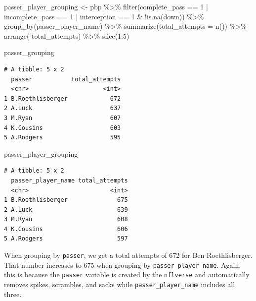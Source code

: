 \documentclass[
  letterpaper,
]{krantz}
\newenvironment{Shaded}{\begin{snugshade}}{\end{snugshade}}
\newcommand{\AttributeTok}[1]{\textcolor[rgb]{0.40,0.45,0.13}{#1}}
\newcommand{\DecValTok}[1]{\textcolor[rgb]{0.68,0.00,0.00}{#1}}
\newcommand{\FunctionTok}[1]{\textcolor[rgb]{0.28,0.35,0.67}{#1}}
\newcommand{\NormalTok}[1]{\textcolor[rgb]{0.00,0.23,0.31}{#1}}
\newcommand{\OtherTok}[1]{\textcolor[rgb]{0.00,0.23,0.31}{#1}}
\newcommand{\SpecialCharTok}[1]{\textcolor[rgb]{0.37,0.37,0.37}{#1}}
\begin{document}
\begin{tcolorbox}
\begin{Shaded}
\begin{Highlighting}[]
\NormalTok{passer\_player\_grouping }\OtherTok{\textless{}{-}}\NormalTok{ pbp }\SpecialCharTok{\%\textgreater{}\%}
  \FunctionTok{filter}\NormalTok{(complete\_pass }\SpecialCharTok{==} \DecValTok{1} \SpecialCharTok{|}
\NormalTok{           incomplete\_pass }\SpecialCharTok{==} \DecValTok{1} \SpecialCharTok{|}
\NormalTok{           interception }\SpecialCharTok{==} \DecValTok{1} \SpecialCharTok{\&} \SpecialCharTok{!}\FunctionTok{is.na}\NormalTok{(down)) }\SpecialCharTok{\%\textgreater{}\%}
  \FunctionTok{group\_by}\NormalTok{(passer\_player\_name) }\SpecialCharTok{\%\textgreater{}\%}
  \FunctionTok{summarize}\NormalTok{(}\AttributeTok{total\_attempts =} \FunctionTok{n}\NormalTok{()) }\SpecialCharTok{\%\textgreater{}\%}
  \FunctionTok{arrange}\NormalTok{(}\SpecialCharTok{{-}}\NormalTok{total\_attempts) }\SpecialCharTok{\%\textgreater{}\%}
  \FunctionTok{slice}\NormalTok{(}\DecValTok{1}\SpecialCharTok{:}\DecValTok{5}\NormalTok{)}

\NormalTok{passer\_grouping}
\end{Highlighting}
\end{Shaded}

\begin{verbatim}
# A tibble: 5 x 2
  passer           total_attempts
  <chr>                     <int>
1 B.Roethlisberger            672
2 A.Luck                      637
3 M.Ryan                      607
4 K.Cousins                   603
5 A.Rodgers                   595
\end{verbatim}

\begin{Shaded}
\begin{Highlighting}[]
\NormalTok{passer\_player\_grouping}
\end{Highlighting}
\end{Shaded}

\begin{verbatim}
# A tibble: 5 x 2
  passer_player_name total_attempts
  <chr>                       <int>
1 B.Roethlisberger              675
2 A.Luck                        639
3 M.Ryan                        608
4 K.Cousins                     606
5 A.Rodgers                     597
\end{verbatim}

When grouping by \texttt{passer}, we get a total attempts of 672 for Ben
Roethlisberger. That number increases to 675 when grouping by
\texttt{passer\_player\_name}. Again, this is because the
\texttt{passer} variable is created by the \texttt{nflverse} and
automatically removes spikes, scrambles, and sacks while
\texttt{passer\_player\_name} includes all three.


\end{tcolorbox}
\end{document}
